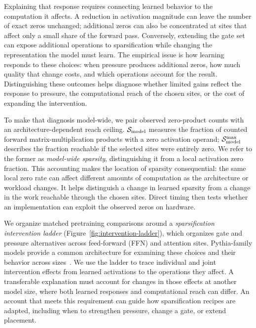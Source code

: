 Explaining that response requires connecting learned behavior to the
computation it affects. A reduction in activation magnitude can leave the
number of exact zeros unchanged; additional zeros can also be concentrated
at sites that affect only a small share of the forward pass. Conversely,
extending the gate set can expose additional operations to sparsification while
changing the representation the model must learn. The empirical issue is how
learning responds to these choices: when pressure produces additional zeros,
how much quality that change costs, and which operations account for the
result. Distinguishing these outcomes helps diagnose whether limited gains
reflect the response to pressure, the computational reach of the chosen sites,
or the cost of expanding the intervention.

To make that diagnosis model-wide, we pair observed zero-product counts with
an architecture-dependent reach ceiling. $\mathcal{S}_{\mathrm{model}}$ measures the
fraction of counted forward matrix-multiplication products with a zero
activation operand; $\mathcal{S}_{\mathrm{model}}^{\max}$ describes the fraction
reachable if the selected sites were entirely zero. We refer to the former as
\emph{model-wide sparsity}, distinguishing it from a local activation zero
fraction. This accounting makes the location of sparsity consequential: the
same local zero rate can affect different amounts of computation as the
architecture or workload changes. It helps distinguish a change in learned
sparsity from a change in the work reachable through the chosen sites.
Direct timing then tests
whether an implementation can exploit the observed zeros on hardware.

We organize matched pretraining comparisons around a \emph{sparsification
intervention ladder} (Figure~\ref{fig:intervention-ladder}), which organizes gate
and pressure alternatives across feed-forward (FFN) and attention sites. Pythia-family
models provide a common architecture for examining these choices and their
behavior across sizes~\citep{biderman2023pythia}. We use the ladder to trace
individual and joint intervention effects from learned activations to the
operations they affect. A transferable explanation must account for changes
in those effects at another model size, where both learned responses and
computational reach can differ. An account that meets this requirement can
guide how sparsification recipes are adapted, including when to strengthen
pressure, change a gate, or extend placement.
